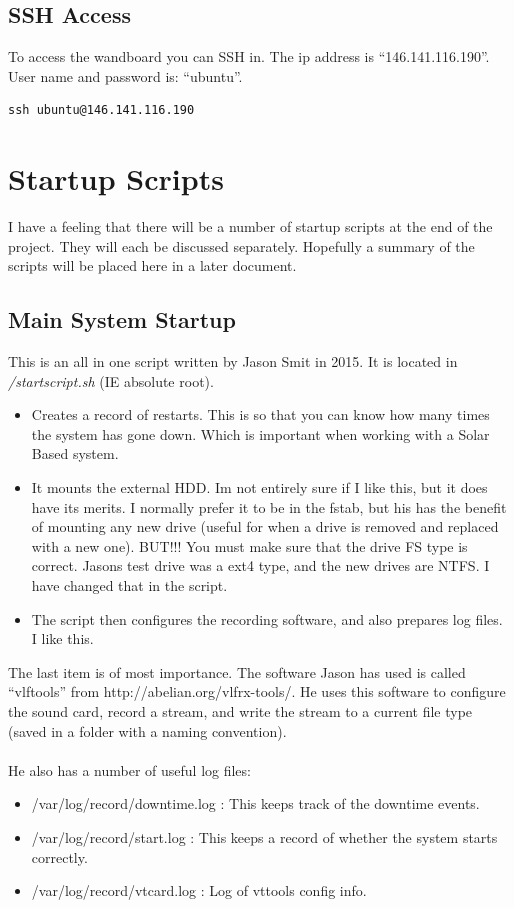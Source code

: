 \documentclass[a4paper,12pt]{article}
\begin{document}
\subsection{SSH Access}
To access the wandboard you can SSH in. The ip address is ``146.141.116.190''. User name and password is: ``ubuntu''.

\begin{verbatim}
ssh ubuntu@146.141.116.190
\end{verbatim}



\section{Startup Scripts}

I have a feeling that there will be a number of startup scripts at the end of the project. They will each be discussed separately. Hopefully a summary of the scripts will be placed here in a later document.

\subsection{Main System Startup}
This is an all in one script written by Jason Smit in 2015. It is located in \emph{/startscript.sh} (IE absolute root).

\begin{itemize}
 	\item Creates a record of restarts. This is so that you can know how many times the system has gone down. Which is important when working with a Solar Based system.
 	\item It mounts the external HDD. Im not entirely sure if I like this, but it does have its merits. I normally prefer it to be in the fstab, but his has the benefit of mounting any new drive (useful for when a drive is removed and replaced with a new one). BUT!!! You must make sure that the drive FS type is correct. Jasons test drive was a ext4 type, and the new drives are NTFS. I have changed that in the script.
 	\item The script then configures the recording software, and also prepares log files. I like this.
 \end{itemize} 

 The last item is of most importance. The software Jason has used is called ``vlftools'' from http://abelian.org/vlfrx-tools/. He uses this software to configure the sound card, record a stream, and write the stream to a current file type (saved in a folder with a naming convention).\\
 \\
 He also has a number of useful log files:
 \begin{itemize}
 	\item /var/log/record/downtime.log 	: This keeps track of the downtime events.
 	\item /var/log/record/start.log 	: This keeps a record of whether the system starts correctly.
 	\item /var/log/record/vtcard.log 	: Log of vttools config info.
 \end{itemize}
\end{document}
